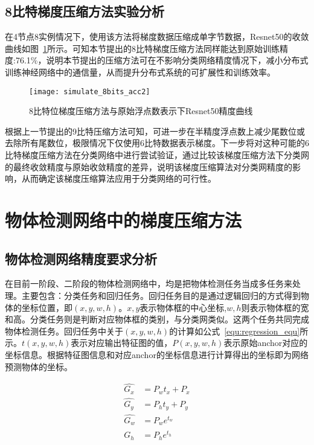 \subsection{8比特梯度压缩方法实验分析}
在4节点8实例情况下，使用该方法将梯度数据压缩成单字节数据，Resnet50的收敛曲线如图~\ref{fig:simulate_8bits_acc}所示。可知本节提出的8比特梯度压缩方法同样能达到原始训练精度:76.1\%，说明本节提出的压缩方法可在不影响分类网络精度情况下，减小分布式训练神经网络中的通信量，从而提升分布式系统的可扩展性和训练效率。
\begin{figure}[htp]
\centering
\texttt{[image: simulate\_8bits\_acc2]}
\caption{8比特位梯度压缩方法与原始浮点数表示下Resnet50精度曲线}
\label{fig:simulate_8bits_acc}
\end{figure}

根据上一节提出的9比特压缩方法可知，可进一步在半精度浮点数上减少尾数位或去除所有尾数位，极限情况下仅使用6比特数据表示梯度。下一步将对这种可能的6比特梯度压缩方法在分类网络中进行尝试验证，通过比较该梯度压缩方法下分类网的最终收敛精度与原始收敛精度的差异，说明该梯度压缩算法对分类网精度的影响，从而确定该梯度压缩算法应用于分类网络的可行性。

\section{物体检测网络中的梯度压缩方法}
\subsection{物体检测网络精度要求分析}
在目前一阶段、二阶段的物体检测网络中，均是把物体检测任务当成多任务来处理。主要包含：分类任务和回归任务。回归任务目的是通过逻辑回归的方式得到物体的坐标位置，即$(x,y,w,h)$。$x,y$表示物体框的中心坐标,$w,h$则表示物体框的宽和高。分类任务则是判断对应物体框的类别，与分类网类似。这两个任务共同完成物体检测任务。回归任务中关于$(x,y,w,h)$的计算如公式~\ref{equ:regression_equ}所示。$t(x,y,w,h)$表示对应输出特征图的值，$P(x,y,w,h)$表示原始anchor对应的坐标信息。根据特征图信息和对应anchor的坐标信息进行计算得出的坐标即为网络预测物体的坐标。

\begin{equation}
\label{equ:regression_equ}
\begin{split}
\hat{G_{x}} &=P_{w}t_{x}+P_{x} \\
\hat{G_{y}} &=P_{h}t_{y}+P_{y} \\
\hat{G_{w}} &=P_{w}e^{t_{w}} \\
\hat{G_{h}} &=P_{h}e^{t_{h}} 
\end{split}
\end{equation}

